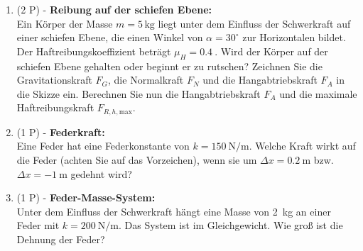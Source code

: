 \documentclass[11pt, a4paper]{article}
\begin{document}
\begin{enumerate}[label=\textbf{\arabic*.},itemsep=0.45cm]
    \item (2 P) - \textbf{Reibung auf der schiefen Ebene:} \\
    Ein Körper der Masse \(m = 5\, \text{kg}\) liegt unter dem Einfluss der Schwerkraft auf einer schiefen Ebene, die einen Winkel von \(\alpha = 30^\circ\) zur Horizontalen bildet. Der Haftreibungskoeffizient beträgt $\mu_H = \SI{0.4}{}$. Wird der Körper auf der schiefen Ebene gehalten oder beginnt er zu rutschen? Zeichnen Sie die Gravitationskraft \(F_G\), die Normalkraft \(F_N\) und die Hangabtriebskraft \(F_A\) in die Skizze ein. Berechnen Sie nun die Hangabtriebskraft \(F_A\) und die maximale Haftreibungskraft \(F_{R,h,\text{max}}\). 
    \begin{center}
        \end{center}

    \item (1 P) - \textbf{Federkraft:} \\
    Eine Feder hat eine Federkonstante von \(k = \SI{150}{\newton\per\meter}\). Welche Kraft wirkt auf die Feder (achten Sie auf das Vorzeichen), wenn sie um $\Delta x = \SI{0.2}{\meter}$ bzw. $\Delta x = \SI{-1}{\meter}$ gedehnt wird? 

    \item (1 P) - \textbf{Feder-Masse-System:} \\
    Unter dem Einfluss der Schwerkraft hängt eine Masse von \SI{2}{\kilogram} an einer Feder mit \(k = \SI{200}{\newton\per\meter}\). Das System ist im Gleichgewicht. Wie groß ist die Dehnung der Feder?


\end{enumerate}
\end{document}
